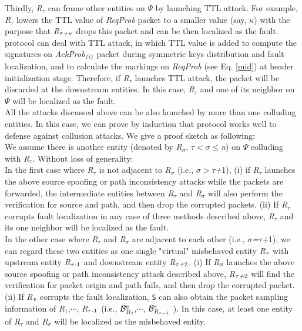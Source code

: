 \indent
Thirdly, \emph{R}$_\tau$ can frame other entities on $\Psi$ by launching TTL attack. For example, \emph{R}$_\tau$ lowers the TTL value of \emph{ReqProb} packet to a smaller value (say, $\kappa$) with the purpose that \emph{R}$_{\tau\emph{+}\kappa}$ drops this packet and can be then localized as the fault. \name{} protocol can deal with TTL attack, in which TTL value is added to compute the signatures on \emph{AckProb}$_{\emph{(i)}}$ packet during symmetric keys distribution and fault localization, and to calculate the markings on \emph{ReqProb} (see Eq. \ref{mid}) at \name{} header initialization stage. Therefore, if \emph{R}$_\tau$ launches TTL attack, the packet will be discarded at the downstream entities. In this case, \emph{R}$_\tau$ and one of its neighbor on $\Psi$ will be localized as the fault.\\
 All the attacks discussed above can be also launched by more than one colluding entities. In this case, we can prove by induction that \name{} protocol works well to defense against collusion attacks. We give a proof sketch as following:\\
\indent We assume there is another entity (denoted by \emph{R}$_\sigma$, $\tau<\sigma\leq$\emph{n}) on $\Psi$ colluding with \emph{R}$_\tau$. Without loss of generality:\\
 In the first case where \emph{R}$_\tau$ is not adjacent to \emph{R}$_\sigma$ (i.e., $\sigma>\tau$\emph{+}1), (i) if \emph{R}$_\tau$ launches the above source spoofing or path inconsistency attacks while the packets are forwarded, the intermediate entities between \emph{R}$_\tau$ and \emph{R}$_\sigma$ will also perform the verification for source and path, and then drop the corrupted packets. (ii) If \emph{R}$_\tau$ corrupts fault localization in any case of three methods described above, \emph{R}$_\tau$ and its one neighbor will be localized as the fault.\\
 In the other case where \emph{R}$_\tau$ and \emph{R}$_\sigma$ are adjacent to each other (i.e., $\sigma$\emph{=}$\tau$\emph{+}1), we can regard these two entities as one single "virtual" misbehaved entity \emph{R}$_\emph{v}$ with upstream entity \emph{R}$_{\tau\emph{-}1}$ and downstream entity \emph{R}$_{\tau\emph{+}2}$. (i) If \emph{R}$_\emph{v}$ launches the above source spoofing or path inconsistency attack described above, \emph{R}$_{\tau\emph{+}2}$ will find the verification for packet origin and path fails, and then drop the corrupted packet. (ii) If \emph{R}$_\emph{v}$ corrupts the fault localization, {\tt S} can also obtain the packet sampling information of \emph{R}$_1$,$\cdots$, \emph{R}$_{\tau\emph{-}1}$ (i.e., $\mathcal{B}_{\emph{R}_\emph{1}}^e$,$\cdots$, $\mathcal{B}_{\emph{R}_{\tau-1}}^e$ ). In this case, at least one entity of \emph{R}$_\tau$ and \emph{R}$_\sigma$ will be localized as the misbehaved entity. 